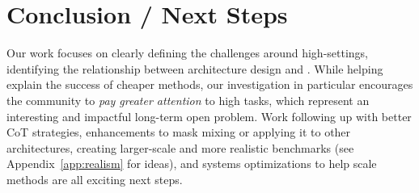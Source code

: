 \section{Conclusion / Next Steps}

Our work focuses on clearly defining the challenges around high-\cname settings, identifying the relationship between architecture design and \cname. While helping explain the success of cheaper  methods, our investigation in particular encourages the community to \textit{pay greater attention} to high \cname tasks, which represent an interesting and impactful long-term open problem. Work following up with better CoT strategies, enhancements to mask mixing or applying it to other architectures, creating larger-scale and more realistic benchmarks (see Appendix~\ref{app:realism} for ideas), and systems optimizations to help scale methods are all exciting next steps. 

